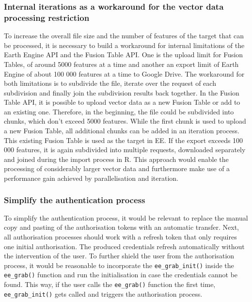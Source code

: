 \subsubsection{Internal iterations as a workaround for the vector data processing restriction}

To increase the overall file size and the number of features of the target that can be processed, it is necessary to build a workaround for internal limitations of the Earth Engine API and the Fusion Table API. One is the upload limit for Fusion Tables, of around 5000 features at a time and another an export limit of Earth Engine of about 100 000 features at a time to Google Drive. The workaround for both limitations is to subdivide the file, iterate over the request of each subdivision and finally join the subdivision results back together. In the Fusion Table API, it is possible to upload vector data as a new Fusion Table or add to an existing one. Therefore, in the beginning, the file could be subdivided into chunks, which don't exceed 5000 features. While the first chunk is used to upload a new Fusion Table, all additional chunks can be added in an iteration process. This existing Fusion Table is used as the target in EE. If the export exceeds 100 000 features, it is again subdivided into multiple requests, downloaded separately and joined during the import process in R. This approach would enable the processing of considerably larger vector data and furthermore make use of a performance gain achieved by parallelisation and iteration. 

\subsubsection{Simplify the authentication process}

To simplify the authentication process, it would be relevant to replace the manual copy and pasting of the authorisation tokens with an automatic transfer. Next, all authorisation processes should work with a refresh token that only requires one initial authorisation. The produced credentials refresh automatically without the intervention of the user. To further shield the user from the authorisation process, it would be reasonable to incorporate the \texttt{ee\_grab\_init()} inside the \texttt{ee\_grab()} function and run the initialisation in case the credentials cannot be found. This way, if the user calls the \texttt{ee\_grab()} function the first time, \texttt{ee\_grab\_init()} gets called and triggers the authorisation process. 

